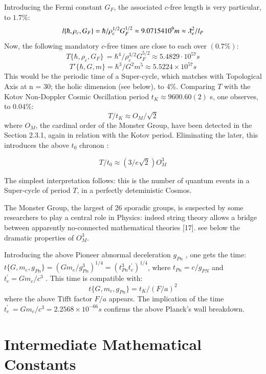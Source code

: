 \documentclass[twoside,draft]{article}
\begin{document}
\begin{sloppypar}
{Introducing the Fermi constant $G_{F}$, the associated $c$-free length is very particular, to $1.7\%$:
$$l\{\hbar,\rho_{c},G_{F}\} = \hbar/\rho_{c}^{1/2} G_{F}^{1/2} \approx 9.07154 10^{9} m \approx \lambdabar_{e}^{2}/l_{P}$$
Now, the following mandatory $c$-free times are close to each over $(0.7\%)$:
\begin{equation}
T\{\hbar,\rho_{c} ,G_{F} \}\, = \hbar^{4} /\rho_{c}^{3/2} G_{F}^{5/2} \approx 5.4829 \cdot 10^{57} s
\end{equation}
$$T\prime\{\hbar,G,m\} = \hbar^{3} /G^{2} m^{5} \approx 5.5224 \times 10^{57} s$$
This would be the periodic time of a Super-cycle, which matches with Topological Axis at n = 30;
the holic dimension (see below), to 4\%. Comparing $T$ with the Kotov Non-Doppler Cosmic
Oscillation period $t_{K} \approx 9600.60(2)$ s, one observes, to $0.04\%$:
$$T/t_{K} \approx O_{M} /\sqrt{2}$$
where $O_{M}$, the cardinal order of the Monster Group, have been detected in the Section 2.3.1, again in relation with the Kotov period. Eliminating the later, this introduces the above $t_0$ chronon :

\begin{equation}
T/t_0 \approx (3/e\sqrt{2})O_M^3
\end{equation}

The simplest interpretation follows: this is the number of quantum events in a Super-cycle of period $T$, in a perfectly deteministic Cosmos. 

The  Monster  Group,  the largest of 26 sporadic groups, is suspected by some researchers to play a central role in Physics: indeed string theory allows a bridge between apparently no-connected mathematical theories [17]. see below the dramatic properties of $O_M^3$.

Introducing the above Pioneer abnormal deceleration $g_{Pn}$ , one gets the time: 
$
t\{G, m_{e} , g_{Pn} \} = (Gm_{e} /g_{Pn}^{3} )^{1/4} = (t_{Pn}^{3} t^{\prime}_{e} )^{1/4}
$, where $t_{Pn} = c/g_{PN}$ and $t^{\prime}_{e} = Gm_{e} /c^{3}$ . This time is compatible with:
\begin{equation}
t\{G, m_{e} , g_{Pn} \} = t_{K} /(F/a)^{2}
\end{equation}
where the above Tifft factor $F/a$ appears. The implication of the time 
$t^{\prime}_{e}\, = Gm_{e} /c^{3} = 2.2568 \times 10^{-66} s$
confirms the above Planck's wall breakdown.

\section{Intermediate Mathematical Constants}
}
\end{sloppypar}
\end{document}
